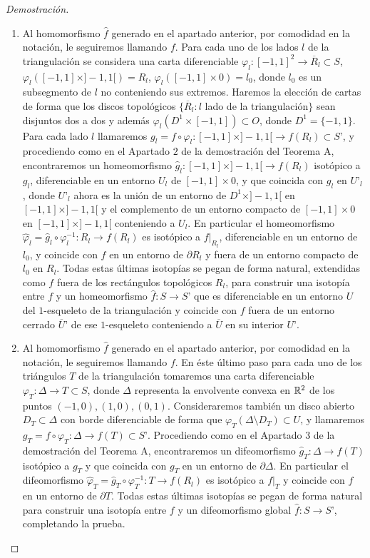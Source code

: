 \begin{proof}[Demostración]
\begin{enumerate}
		\item Al homomorfismo $\hat f$ generado en el apartado anterior, por comodidad en la notación, le seguiremos llamando $f$. Para cada uno de los lados $l$ de la triangulación se considera una carta diferenciable $\varphi_l\colon [-1,1]^2\to \overline{R}_l\subset S$, $\varphi_l([-1,1]\times ]-1,1[)=R_l$, $\varphi_l([-1,1] \times 0)=l_0$, donde $l_0$ es un subsegmento de $l$ no conteniendo sus extremos. Haremos la elección de cartas de forma que los discos topológicos $\{\overline{R}_l\colon l$ lado de la triangulación$\}$ sean disjuntos dos a dos y además $\varphi_l(D^1 \times [-1,1])\subset O$, donde $D^1=\{-1, 1\}$. Para cada lado $l$ llamaremos $g_l=f\circ \varphi_l:[-1,1]\times ]-1,1[\to f(R_l)\subset S’$, y procediendo como en el Apartado $2$ de la demostración del Teorema A, encontraremos un homeomorfismo $\hat g_l:[-1,1]\times ]-1,1[\to f(R_l)$ isotópico a  $g_l$, diferenciable en un entorno $U_l$ de $[-1,1] \times 0$, y que coincida con $g_l$ en $U’_l$, donde $U’_l$ ahora es la unión de un entorno de $D^1 \times ]-1,1[$ en $[-1,1]\times ]-1,1[$  y el complemento de un entorno compacto de $[-1,1] \times 0$ en $[-1,1]\times ]-1,1[$ conteniendo a $U_l$. En particular el homeomorfismo $\hat \varphi_l=\hat g_l\circ \varphi_l^{-1}:R_l\to f(R_l)$ es isotópico a  $f|_{R_l}$, diferenciable en un entorno de $l_0$, y  coincide con $f$ en un entorno de $\partial R_l$ y fuera de un entorno compacto de $l_0$ en $R_l$. Todas estas últimas isotopías se pegan de forma natural, extendidas como $f$ fuera de los rectángulos topológicos $R_l$, para construir una isotopía entre $f$ y un homeomorfismo $\hat f\colon S\to S’$ que es diferenciable en un entorno $U$ del $1$-esqueleto de la triangulación y coincide con $f$ fuera de un entorno cerrado $\overline{U}’$ de ese $1$-esqueleto conteniendo a $\overline U$ en su interior $U’$.

		\item Al homomorfismo $\hat f$ generado en el apartado anterior, por comodidad en la notación, le seguiremos llamando $f$.  En éste último paso para cada uno de los triángulos $T$ de la triangulación tomaremos una carta diferenciable $\varphi_T\colon \Delta \to T\subset S$, donde $\Delta$ representa la envolvente convexa en $\mathbb{R}^2$ de los puntos $(-1,0), (1,0), (0,1)$. Consideraremos también un disco abierto $D_T \subset \Delta$ con borde diferenciable de forma que $\varphi_T(\Delta\setminus D_T)\subset U$, y llamaremos $g_T=f\circ \varphi_T:\Delta \to f(T)\subset S’$. Procediendo como en el Apartado 3 de la demostración del Teorema A, encontraremos un difeomorfismo $\hat g_T:\Delta\to f(T)$ isotópico a  $g_T$ y que coincida con $g_T$ en un entorno de $\partial \Delta$. En particular el difeomorfismo $\hat \varphi_T=\hat g_T\circ \varphi_T^{-1}:T\to f(R_l)$ es isotópico a  $f|_{T}$ y  coincide con $f$ en un entorno de $\partial T$. Todas estas últimas isotopías se pegan de forma natural para construir una isotopía entre $f$ y un difeomorfismo global $\hat f\colon S\to S’$, completando la prueba.
		\end{enumerate}
	\end{proof}
\endinput
